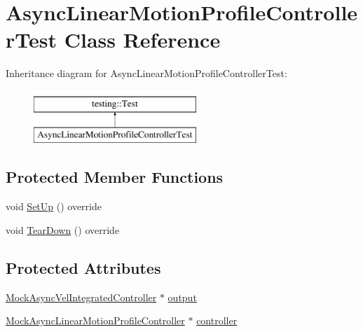 \hypertarget{classAsyncLinearMotionProfileControllerTest}{}\section{Async\+Linear\+Motion\+Profile\+Controller\+Test Class Reference}
\label{classAsyncLinearMotionProfileControllerTest}
Inheritance diagram for Async\+Linear\+Motion\+Profile\+Controller\+Test\+:\begin{figure}[H]
\begin{center}
\leavevmode
\includegraphics[height=2.000000cm]{classAsyncLinearMotionProfileControllerTest}
\end{center}
\end{figure}
\subsection*{Protected Member Functions}
\begin{DoxyCompactItemize}
\item 
void \mbox{\hyperlink{classAsyncLinearMotionProfileControllerTest_a971da04c4a5aa028f73a23a114f29497}{Set\+Up}} () override
\item 
void \mbox{\hyperlink{classAsyncLinearMotionProfileControllerTest_af2400315a5078e35947f4c0e2dad5b53}{Tear\+Down}} () override
\end{DoxyCompactItemize}
\subsection*{Protected Attributes}
\begin{DoxyCompactItemize}
\item 
\mbox{\hyperlink{classokapi_1_1MockAsyncVelIntegratedController}{Mock\+Async\+Vel\+Integrated\+Controller}} $\ast$ \mbox{\hyperlink{classAsyncLinearMotionProfileControllerTest_a21a36d7ecc0800d0ecb1676498747bbb}{output}}
\item 
\mbox{\hyperlink{classMockAsyncLinearMotionProfileController}{Mock\+Async\+Linear\+Motion\+Profile\+Controller}} $\ast$ \mbox{\hyperlink{classAsyncLinearMotionProfileControllerTest_ac611e59231a63010be1b4e3734b1f5d9}{controller}}
\end{DoxyCompactItemize}
